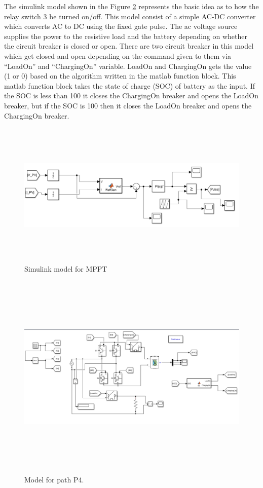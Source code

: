 \documentclass[a4paper,12pt]{iitmdiss}
\begin{document}
The simulink model shown in the Figure \ref{fig:4.7} represents the basic idea as to how the relay switch 3 be turned on/off. This model consist of a simple AC-DC converter which converts AC to DC using the fixed gate pulse. The ac voltage source supplies the power to the resistive load and the battery depending on whether the circuit breaker is closed or open. There are two circuit breaker in this model which get closed and open depending on the command given to them via \enquote{LoadOn} and \enquote{ChargingOn} variable. LoadOn and ChargingOn gets the value (1 or 0) based on the algorithm written in the matlab function block. This matlab function block takes the state of charge (SOC) of battery as the input. If the SOC is less than 100 it closes the ChargingOn breaker and opens the LoadOn breaker, but if the SOC is 100 then it closes the LoadOn breaker and opens the ChargingOn breaker.



\begin{figure}[hbt!]
    \centering
    \includegraphics[width=15cm,height=7cm]{MPPT(model simulink).png}
    \caption{Simulink model for MPPT}
    \label{fig:4.6}
\end{figure}

\begin{figure}[hbt!]
    \centering
    \includegraphics[width=18cm,height=10cm]{path P4.png}
    \caption{Model for path P4.}
    \label{fig:4.7}
\end{figure}
\end{document}
